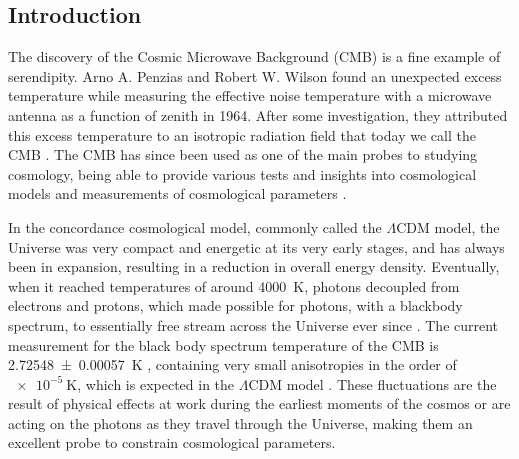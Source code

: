 \documentclass[openany,a4paper,12pt,oneside]{book}
\begin{document}
\listoffigures


\listoftables

\tableofcontents

\cleardoublepage
{}

\begingroup
{}
\begin{spacing}{1.5}
\setlength{\abovedisplayskip}{0.01cm}
\setlength{\abovedisplayshortskip}{0.01cm}

\chapter{Introduction}

The discovery of the Cosmic Microwave Background (CMB) is a fine example of serendipity. Arno A. Penzias and Robert W. Wilson found an unexpected excess temperature while measuring the effective noise temperature with a microwave antenna as a function of zenith in 1964. After some investigation, they attributed this excess temperature to an isotropic radiation field that today we call the CMB \cite{1965CMB_discovery}. The CMB has since been used as one of the main probes to studying cosmology, being able to provide various tests and insights into cosmological models \cite{Large_scale_anomalies, nongaussianity_inflation, rees_sciama_effect} and measurements of cosmological parameters \cite{WMAP_results, Planck_results}. 

In the concordance cosmological model, commonly called the $\Lambda$CDM model, the Universe was very compact and energetic at its very early stages, and has always been in expansion, resulting in a reduction in overall energy density. Eventually, when it reached temperatures of around \SI{4000}{\kelvin}, photons decoupled from electrons and protons, which made possible for photons, with a blackbody spectrum, to essentially free stream across the Universe ever since \cite{CMB_physical_explanation}. The current measurement for the black body spectrum temperature of the CMB is \SI{2.72548 \pm 0.00057}{\kelvin} \cite{CMB_temperature:Fixsen_2009}, containing very small anisotropies in the order of $\SI{e-5}{\kelvin}$, which is expected in the $\Lambda$CDM model \cite{CMB_analytical_anisotropies}. These fluctuations are the result of physical effects at work during the earliest moments of the cosmos or are acting on the photons as they travel through the Universe, making them an excellent probe to constrain cosmological parameters.


\end{spacing}
\end{document}
